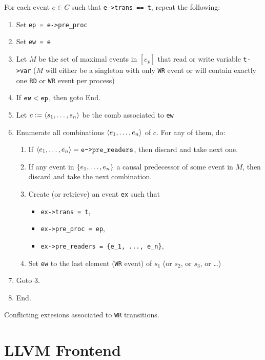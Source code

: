 \documentclass{llncs}
\begin{document}
\begin{algorithm}
\noindent
For each event $e \in C$ such that \verb!e->trans == t!, repeat the following:
\begin{enumerate}
\item Set \verb!ep = e->pre_proc!
\item Set \verb!ew = e!
\item
  Let $M$ be the set of maximal events in $[e_p]$ that read or write variable
  \verb!t->var! ($M$ will either be a singleton with only \verb!WR! event or
  will contain exactly one \verb!RD! or \verb!WR! event per process)
\item If $\verb!ew! < \verb!ep!$, then goto End.
\item Let $c \mathrel{:=} \langle s_1, \ldots, s_n\rangle$ be the comb associated to \verb!ew!
\item
  Enumerate all combinations $\langle e_1, \ldots, e_n\rangle$ of $c$.
  For any of them, do:
  \begin{enumerate}
  \item
    If $\tup{e_1, \ldots, e_n} = \verb!e->pre_readers!$, then discard and take
    next one.
  \item
    If any event in ${\{ e_1, \ldots, e_n \mathclose \}}$ a causal predecessor of some event in
    $M$, then discard and take the next combination.
  \item
    Create (or retrieve) an event \verb!ex! such that
    \begin{itemize}
    \item \verb!ex->trans = t!,
    \item \verb!ex->pre_proc = ep!,
    \item \verb!ex->pre_readers = {e_1, ..., e_n}!,
    \end{itemize}
  \item
    Set \verb!ew! to the last element (\verb!WR! event) of $s_1$
    (or $s_2$, or $s_3$, or \ldots)
  \end{enumerate}
\item Goto 3.
\item End.
\end{enumerate}
\caption{Conflicting extesions associated to \texttt{WR} transitions.}
\label{a:cex_wr}
\end{algorithm}



\section{LLVM Frontend}
\end{document}
